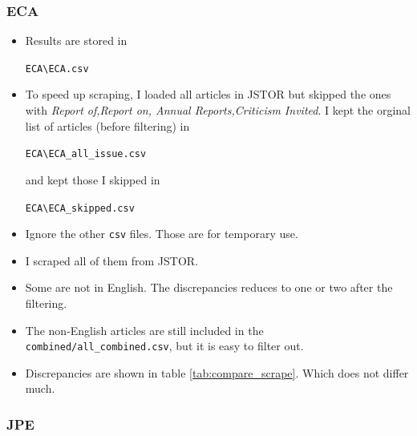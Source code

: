\subsubsection*{ECA}

\begin{itemize}
    \item Results are stored in 
    \begin{center}
        \verb|ECA\ECA.csv|
    \end{center}
    \item To speed up scraping, I loaded all articles in JSTOR but skipped the ones with \emph{Report of,Report on, Annual Reports,Criticism Invited}. I kept the orginal list of articles (before filtering) in 
    \begin{center}
        \verb|ECA\ECA_all_issue.csv|
    \end{center}
    and kept those I skipped in
    \begin{center}
        \verb|ECA\ECA_skipped.csv|
    \end{center}
    \item Ignore the other \verb|csv| files. Those are for temporary use.
    \item I scraped all of them from JSTOR.
    \item Some are not in English. The discrepancies reduces to one or two after the filtering.
    \item The non-English articles are still included in the \verb|combined/all_combined.csv|, but it is easy to filter out.
    \item Discrepancies are shown in table \ref{tab:compare_scrape}. Which does not differ much.
\end{itemize}

\subsubsection*{JPE}

